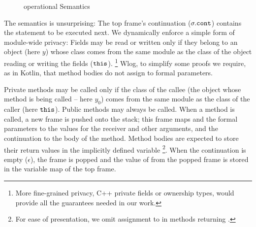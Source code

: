 \begin{figure}[bt]
\begin{minipage}{\textwidth}
{
 }
\end{minipage}
 \caption{\LangOO operational Semantics}
\label{f:loo-semantics}
\end{figure}

The semantics is unsurprising:  
The  top frame's continuation {(${\sigma.\mbox{\normalfont{\texttt{cont}}}}$)} contains the statement to be  executed next.  
We dynamically enforce a simple form of module-wide privacy: 
Fields may be read or written only if they {belong to an object (here $y$)} whose class comes from the same module as the  class of the object 
reading or writing the fields ($\mbox{\normalfont{\texttt{this}}}$). \footnote{More fine-grained privacy, \eg C++ private fields or ownership types, would provide all
the guarantees needed in our work.} %
Wlog, {to simplify some proofs} we  require, as in Kotlin, that method bodies do not assign to formal parameters.

Private methods may be called only if the class of %
the callee ({the object whose method  is being called -- here $y_0$}) %
comes from the same module as the  class of the caller (here $\mbox{\normalfont{\texttt{this}}}$).
Public methods may always be called.
When a method is called, a new frame is pushed onto the stack; this frame  maps  and the formal parameters to  the values for the receiver and other arguments, and the continuation to the body of the method. 
Method bodies are expected to store their return values in the {implicitly defined} variable \footnote{For ease of presentation, we omit assignment to  in methods returning .}. %
  When the continuation is  empty ($\epsilon$), the frame is popped and the value of 
 from the popped frame  is stored  in the variable map of the top frame.

